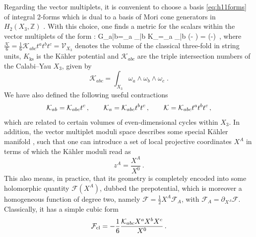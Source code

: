 Regarding the vector multiplets, it is convenient to choose a basis \eqref{eq:h11forms} of integral 2-forms which is dual to a basis of Mori cone generators in $H_2(X_3,\mathbb{Z})$ \cite{Lanza:2021udy}. With this choice, one finds a metric for the scalars within the vector multiplets of the form \cite{Candelas:1990pi,Strominger:1985ks}:
%
\beq\label{eq:kahlersectormetric}
	G_{a\bar b}=\partial_a \partial_{\bar{b}} K_{}=\partial_a \partial_{\bar{b}} \left(- \log {}  \right) =  \left(-\right)\, ,
\eeq
%
where $\frac{\mathcal{K}}{6}=\frac{1}{6} \mathcal{K}_{a b c}t^a t^b t^c = \mathcal{V}_{X_3}$ denotes the volume of the classical three-fold in string units, $K_{\text{ks}}$ is the K\"ahler potential and $\mathcal{K}_{a b c}$ are the triple intersection numbers of the Calabi--Yau $X_3$, given by
%
\begin{equation}
	\mathcal{K}_{a b c}=\int_{X_3}\omega_a\wedge\omega_b\wedge \omega_c\;.
\end{equation}
%	
We have also defined the following useful contractions
%
\begin{align}
{\cal K}_{ab}=\mathcal{K}_{a b c}t^c \, ,\qquad {\cal K}_{a}=\mathcal{K}_{a b c}t^b t^c \, ,\qquad {\cal K}=\mathcal{K}_{a b c}t^a t^b t^c\, ,
\end{align}
%
which are related to certain volumes of even-dimensional cycles within $X_3$. In addition, the vector multiplet moduli space describes some special K\"ahler manifold \cite{deWit:1984wbb}, such that one can introduce a set of local projective coordinates $X^A$ in terms of which the K\"ahler moduli read as
%
\begin{equation}\label{eq:projcoords}
	z^A = \frac{X^A}{X^0}\, .
\end{equation}
%
This also means, in practice, that its geometry is completely encoded into some holomorphic quantity $\mathcal{F} (X^A)$, dubbed the prepotential, which is moreover a homogeneous function of degree two, namely $\mathcal{F}= \frac{1}{2} X^A \mathcal{F}_A$, with $\mathcal{F}_A = \partial_{X^A} \mathcal{F}$. Classically, it has a simple cubic form
%
\begin{equation}\label{eq:classicalprepotential}
	\mathcal{F}_{\rm cl} = - \frac{1}{6} \frac{\mathcal{K}_{a b c} X^a X^b X^c}{X^0}\, .
\end{equation}
%

